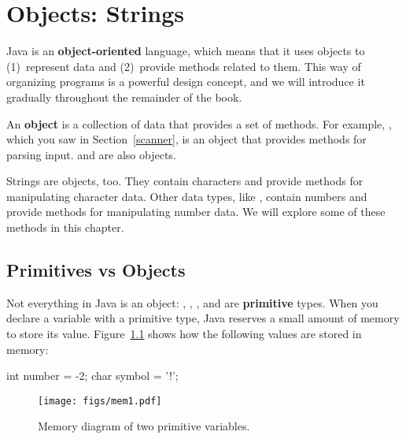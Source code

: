 \chapter{Objects: Strings} 
\label{object:Strings}


Java is an {\bf object-oriented} language, which means that it uses objects to (1)~represent data and (2)~provide methods related to them.
This way of organizing programs is a powerful design concept, and we will introduce it gradually throughout the remainder of the book.


An {\bf object} is a collection of data that provides a set of methods.
For example, , which you saw in Section~\ref{scanner}, is an object that provides methods for parsing input.
 and  are also objects.

Strings are objects, too.
They contain characters and provide methods for manipulating character data.
Other data types, like , contain numbers and provide methods for manipulating number data.
We will explore some of these methods in this chapter.


\section{Primitives vs Objects}


Not everything in Java is an object: , , , and  are {\bf primitive} types.
When you declare a variable with a primitive type, Java reserves a small amount of memory to store its value.
Figure~\ref{fig.mem1} shows how the following values are stored in memory:

\begin{code}
int number = -2;
char symbol = '!';
\end{code}

\begin{figure}[!ht]
\begin{center}
\texttt{[image: figs/mem1.pdf]}
\caption{Memory diagram of two primitive variables.}
\label{fig.mem1}
\end{center}
\end{figure}

